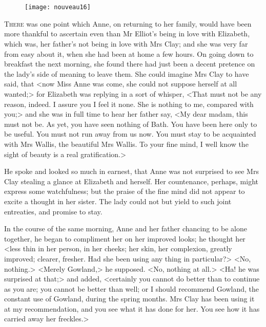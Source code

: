 \chapter[Chapter \thechapter]{}

\begin{figure}[t!]
\centering
\texttt{[image: nouveau16]}
\end{figure}

\lettrine[lraise=0.3]{T}{here} was one point which Anne, on returning to her family, would have been more thankful to ascertain even than Mr Elliot's being in love with Elizabeth, which was, her father's not being in love with Mrs Clay; and she was very far from easy about it, when she had been at home a few hours. On going down to breakfast the next morning, she found there had just been a decent pretence on the lady's side of meaning to leave them. She could imagine Mrs Clay to have said, that <now Miss Anne was come, she could not suppose herself at all wanted;> for Elizabeth was replying in a sort of whisper, <That must not be any reason, indeed. I assure you I feel it none. She is nothing to me, compared with you;> and she was in full time to hear her father say, <My dear madam, this must not be. As yet, you have seen nothing of Bath. You have been here only to be useful. You must not run away from us now. You must stay to be acquainted with Mrs Wallis, the beautiful Mrs Wallis. To your fine mind, I well know the sight of beauty is a real gratification.>

He spoke and looked so much in earnest, that Anne was not surprised to see Mrs Clay stealing a glance at Elizabeth and herself. Her countenance, perhaps, might express some watchfulness; but the praise of the fine mind did not appear to excite a thought in her sister. The lady could not but yield to such joint entreaties, and promise to stay.

In the course of the same morning, Anne and her father chancing to be alone together, he began to compliment her on her improved looks; he thought her <less thin in her person, in her cheeks; her skin, her complexion, greatly improved; clearer, fresher. Had she been using any thing in particular?> <No, nothing.> <Merely Gowland,> he supposed. <No, nothing at all.> <Ha! he was surprised at that;> and added, <certainly you cannot do better than to continue as you are; you cannot be better than well; or I should recommend Gowland, the constant use of Gowland, during the spring months. Mrs Clay has been using it at my recommendation, and you see what it has done for her. You see how it has carried away her freckles.>

